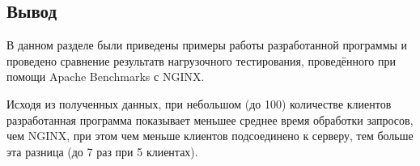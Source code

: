 \subsection*{Вывод}
В данном разделе были приведены примеры работы разработанной программы и проведено сравнение результатв нагрузочного тестирования, проведённого при помощи Apache Benchmarks с NGINX.

Исходя из полученных данных, при небольшом (до 100) количестве клиентов разработанная программа показывает меньшее среднее время обработки запросов, чем NGINX, при этом чем меньше клиентов подсоединено к серверу, тем больше эта разница (до 7 раз при 5 клиентах).




